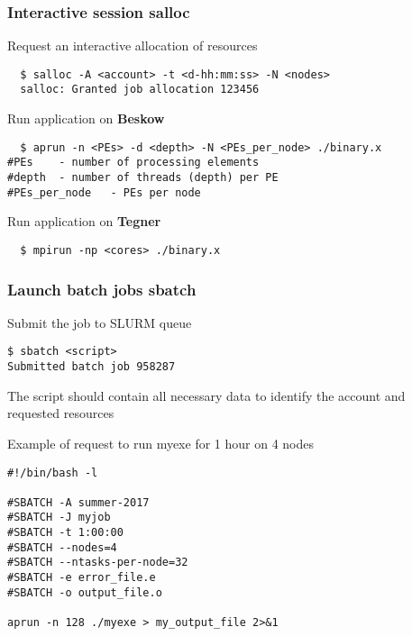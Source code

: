 \begin{frame}[fragile]
\frametitle{Interactive session \hfill \alert{\textbf{salloc}}}

\begin{exampleblock}{Request an interactive allocation of resources}
  \begin{verbatim}
  $ salloc -A <account> -t <d-hh:mm:ss> -N <nodes>
  salloc: Granted job allocation 123456
   \end{verbatim}
\end{exampleblock}

\begin{exampleblock}{Run application on \alert{\textbf{Beskow}}}
  \begin{verbatim}
  $ aprun -n <PEs> -d <depth> -N <PEs_per_node> ./binary.x
#PEs 	- number of processing elements
#depth 	- number of threads (depth) per PE
#PEs_per_node 	- PEs per node
  \end{verbatim}
\end{exampleblock}
  
  
\begin{exampleblock}{Run application on \alert{\textbf{Tegner}}}

  \begin{verbatim}
  $ mpirun -np <cores> ./binary.x
  \end{verbatim}
\end{exampleblock}
\end{frame}

\begin{frame}[fragile]
\frametitle{Launch batch jobs \hfill  \alert{\textbf{sbatch}}}
\begin{exampleblock}{Submit the job to SLURM queue}
  \begin{verbatim}
$ sbatch <script>
Submitted batch job 958287
  \end{verbatim}
\end{exampleblock}

\scriptsize
The script should contain all necessary data to identify the account and requested resources 
\begin{exampleblock}{Example of request to run myexe for 1 hour on 4 nodes}
  \begin{verbatim}
#!/bin/bash -l

#SBATCH -A summer-2017
#SBATCH -J myjob
#SBATCH -t 1:00:00
#SBATCH --nodes=4
#SBATCH --ntasks-per-node=32
#SBATCH -e error_file.e
#SBATCH -o output_file.o

aprun -n 128 ./myexe > my_output_file 2>&1
  \end{verbatim}
\end{exampleblock}

\end{frame}

